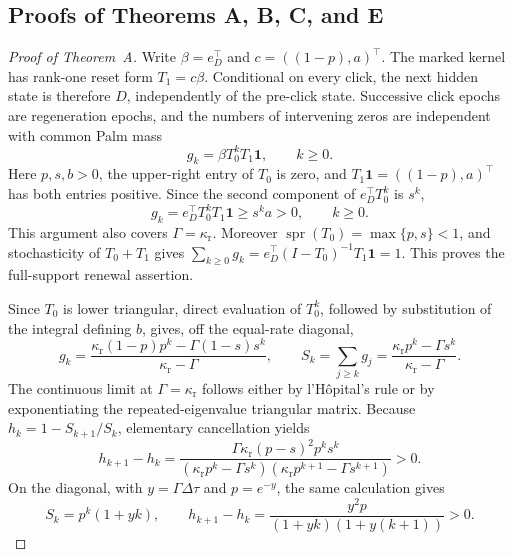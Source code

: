 \subsection{Proofs of Theorems A, B, C, and E}\label{subsec:proofs-a-d-main}

\begin{proof}[Proof of Theorem~A]
Write \(\beta=e_D^\top\) and
\(c=((1-p),a)^\top\).  The marked kernel has rank-one reset form
\(T_1=c\beta\).  Conditional on every click, the next hidden state is therefore
\(D\), independently of the pre-click state.  Successive click epochs are
regeneration epochs, and the numbers of intervening zeros are independent with
common Palm mass
\[
g_k=\beta T_0^kT_1\mathbf1,\qquad k\ge0.
\]
Here \(p,s,b>0\), the upper-right entry of \(T_0\) is zero, and
\(T_1\mathbf1=((1-p),a)^\top\) has both entries positive.  Since the
second component of \(e_D^\top T_0^k\) is \(s^k\),
\[
g_k=e_D^\top T_0^kT_1\mathbf1\ge s^ka>0,
\qquad k\ge0.
\]
This argument also covers \(\Gamma=\kappa_{\mathrm r}\).  Moreover
\(\operatorname{spr}(T_0)=\max\{p,s\}<1\), and stochasticity of
\(T_0+T_1\) gives
\(\sum_{k\ge0}g_k=e_D^\top(I-T_0)^{-1}T_1\mathbf1=1\).
This proves the full-support renewal assertion.

Since \(T_0\) is lower triangular, direct evaluation of \(T_0^k\), followed by
substitution of the integral defining \(b\), gives, off the equal-rate diagonal,
\[
g_k=\frac{\kappa_{\mathrm r}(1-p)p^k-
\Gamma(1-s)s^k}{\kappa_{\mathrm r}-\Gamma},\qquad
S_k=\sum_{j\ge k}g_j=
\frac{\kappa_{\mathrm r}p^k-\Gamma s^k}
{\kappa_{\mathrm r}-\Gamma}.
\]
The continuous limit at \(\Gamma=\kappa_{\mathrm r}\) follows either by
l'H\^opital's rule or by exponentiating the repeated-eigenvalue triangular
matrix.  Because \(h_k=1-S_{k+1}/S_k\), elementary cancellation yields
\[
h_{k+1}-h_k=
\frac{\Gamma\kappa_{\mathrm r}(p-s)^2p^ks^k}
{(\kappa_{\mathrm r}p^k-\Gamma s^k)
 (\kappa_{\mathrm r}p^{k+1}-\Gamma s^{k+1})}>0.
\]
On the diagonal, with \(y=\Gamma\Delta\tau\) and \(p=e^{-y}\), the same
calculation gives
\[
S_k=p^k(1+yk),\qquad
h_{k+1}-h_k=\frac{y^2p}{(1+yk)(1+y(k+1))}>0.
\]


\end{proof}

